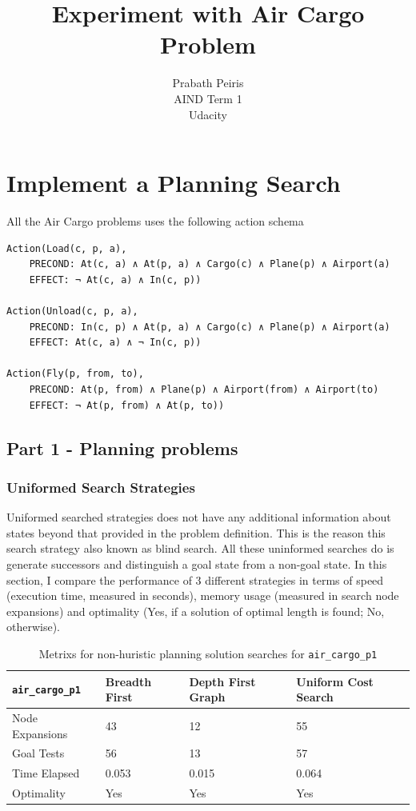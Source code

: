\documentclass{article}
\begin{document}
\author{Prabath Peiris  \\ AIND Term 1 \\ Udacity}
\date{}
\title{Experiment with Air Cargo Problem}
\maketitle

\section*{Implement a Planning Search}


All the Air Cargo problems uses the following action schema

\begin{verbatim}
Action(Load(c, p, a),
	PRECOND: At(c, a) ∧ At(p, a) ∧ Cargo(c) ∧ Plane(p) ∧ Airport(a)
	EFFECT: ¬ At(c, a) ∧ In(c, p))

Action(Unload(c, p, a),
	PRECOND: In(c, p) ∧ At(p, a) ∧ Cargo(c) ∧ Plane(p) ∧ Airport(a)
	EFFECT: At(c, a) ∧ ¬ In(c, p))

Action(Fly(p, from, to),
	PRECOND: At(p, from) ∧ Plane(p) ∧ Airport(from) ∧ Airport(to)
	EFFECT: ¬ At(p, from) ∧ At(p, to))
\end{verbatim}

\subsection*{Part 1 - Planning problems}
\subsubsection*{Uniformed Search Strategies}
Uniformed searched strategies does not have any additional information about states beyond that provided in the problem definition. This is the reason this search strategy also known as blind search. All these uninformed searches do is generate successors and distinguish a goal state from a non-goal state. In this section, I compare the performance of 3 different strategies in terms of speed (execution time, measured in seconds), memory usage (measured in search node expansions) and optimality (Yes, if a solution of optimal length is found; No, otherwise).

\begin{table}[h]
\begin{center}
\begin{tabular}{|l|l|l|l|}
\hline
{\tt air\_cargo\_p1} & Breadth First & Depth First Graph& Uniform Cost Search \\ \hline\hline
Node Expansions& 43 & 12 & 55\\ 
Goal Tests & 56 & 13 & 57\\ 
Time Elapsed& 0.053 & 0.015 & 0.064\\ 
Optimality & Yes & Yes & Yes\\ \hline
\end{tabular}
\end{center}
\caption{Metrixs for non-huristic planning solution searches for {\tt air\_cargo\_p1}}
\label{tbl:p1p1}
\end{table}
\end{document}
